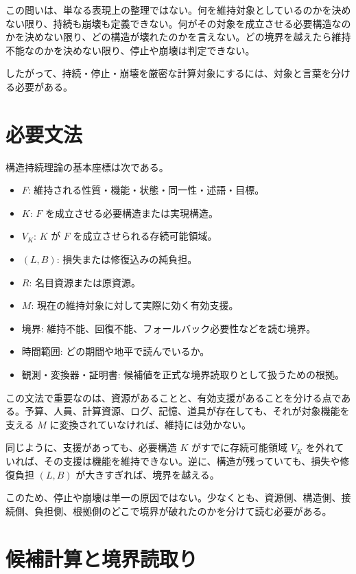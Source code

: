 \documentclass[12pt,a4paper]{article}
\begin{document}
この問いは、単なる表現上の整理ではない。何を維持対象としているのかを決めない限り、持続も崩壊も定義できない。何がその対象を成立させる必要構造なのかを決めない限り、どの構造が壊れたのかを言えない。どの境界を越えたら維持不能なのかを決めない限り、停止や崩壊は判定できない。

したがって、持続・停止・崩壊を厳密な計算対象にするには、対象と言葉を分ける必要がある。

\section{必要文法}\label{ux5fc5ux8981ux6587ux6cd5}

構造持続理論の基本座標は次である。

\begin{itemize}
\tightlist
\item
  $F$: 維持される性質・機能・状態・同一性・述語・目標。
\item
  $K$: $F$ を成立させる必要構造または実現構造。
\item
  $V_K$: $K$ が $F$ を成立させられる存続可能領域。
\item
  $(L,B)$: 損失または修復込みの純負担。
\item
  $R$: 名目資源または原資源。
\item
  $M$: 現在の維持対象に対して実際に効く有効支援。
\item
  境界: 維持不能、回復不能、フォールバック必要性などを読む境界。
\item
  時間範囲: どの期間や地平で読んでいるか。
\item
  観測・変換器・証明書: 候補値を正式な境界読取りとして扱うための根拠。
\end{itemize}

この文法で重要なのは、資源があることと、有効支援があることを分ける点である。予算、人員、計算資源、ログ、記憶、道具が存在しても、それが対象機能を支える $M$ に変換されていなければ、維持には効かない。

同じように、支援があっても、必要構造 $K$ がすでに存続可能領域 $V_K$ を外れていれば、その支援は機能を維持できない。逆に、構造が残っていても、損失や修復負担 $(L,B)$ が大きすぎれば、境界を越える。

このため、停止や崩壊は単一の原因ではない。少なくとも、資源側、構造側、接続側、負担側、根拠側のどこで境界が破れたのかを分けて読む必要がある。

\section{候補計算と境界読取り}\label{ux5019ux88dcux8a08ux7b97ux3068ux5883ux754cux8aadux53d6ux308a}
\end{document}

